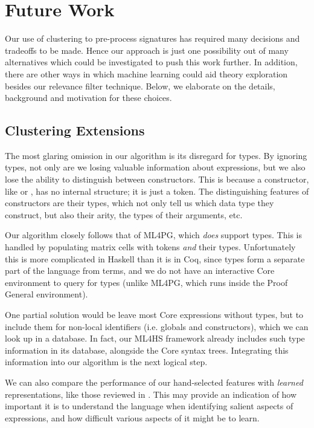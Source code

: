 \section{Future Work}
\label{sec:future}

Our use of clustering to pre-process \qspec{} signatures has required many
decisions and tradeoffs to be made. Hence our approach is just one possibility
out of many alternatives which could be investigated to push this work
further. In addition, there are other ways in which machine learning could aid
theory exploration besides our relevance filter technique. Below, we elaborate
on the details, background and motivation for these choices.

\subsection{Clustering Extensions}
\label{sec:preprocessing}

The most glaring omission in our algorithm is its disregard for types. By
ignoring types, not only are we losing valuable information about expressions,
but we also lose the ability to distinguish between constructors. This is
because a constructor, like  or , has no internal structure;
it is just a token. The distinguishing features of constructors are their types,
which not only tell us which data type they construct, but also their arity, the
types of their arguments, etc.

Our algorithm closely follows that of ML4PG, which \emph{does} support
types. This is handled by populating matrix cells with tokens \emph{and} their
types. Unfortunately this is more complicated in Haskell than it is in Coq,
since types form a separate part of the language from terms, and we do not have
an interactive Core environment to query for types (unlike ML4PG, which runs
inside the Proof General environment).

One partial solution would be leave most Core expressions without types, but to
include them for non-local identifiers (i.e. globals and constructors), which we
can look up in a database. In fact, our ML4HS framework already includes such
type information in its database, alongside the Core syntax trees. Integrating
this information into our algorithm is the next logical step.

We can also compare the performance of our hand-selected features with
\emph{learned} representations, like those reviewed in
\cite{bengio2013representation}. This may provide an indication of how
important it is to understand the language when identifying salient aspects of
expressions, and how difficult various aspects of it might be to learn.

